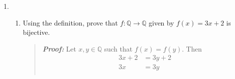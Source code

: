 \documentclass{article}
\newcommand{\Proof}{\textit{\textbf{Proof: }}}
\newcommand{\ZZ}{\mathbb{Z}}
\newcommand{\QQ}{\mathbb{Q}}
\begin{document}
\begin{enumerate}
\begin{enumerate}
\item Establish the following identity using induction.
\[
\sum_{i = 1}^{n}i^{3} = \left(\frac{n(n+1)}{2}\right)^{2}
\]
\begin{quote}
\Proof \\
\textit{\textbf{Base Case: }} $n = 1$
\begin{align*}
\sum_{i = 1}^{1}i^{3} &= \left(\frac{1(1+1)}{2}\right)^{2}\\
1 ^{3} &= \left(\frac{2}{2}\right)^{2}\\
1 &= 1
\end{align*}
\textit{\textbf{Assume: }} $$\sum_{i = 1}^{n}i^{3} = \left(\frac{n(n+1)}{2}\right)^{2}$$
\textit{\textbf{Prove: }}
\[
\sum_{i = 1}^{n + 1}i^{3} = \left(\frac{(n + 1)(n+2)}{2}\right)^{2}
\]
\begin{align*}
\therefore \sum_{i = 1}^{n}i^{3} + \sum_{i = n + 1}^{n + 1}i^{3} &= \left(\frac{n(n+1)}{2}\right)^{2} + (n + 1)^{3}\ \ \text{By the Induction Hypothesis}\\
&= \frac{n^{2}(n+1)^{2}}{4} + (n+1)^{3}\\
&= \frac{n^{2}(n+1)^{2}}{4} + \frac{4(n+1)^{3}}{4}\\
&= \frac{n^{2}(n+1)^{2} + 4(n+1)^{3}}{4}\\
&= \frac{(n+1)^{2}(n^{2} + 4n + 4)}{4}\\
&= \frac{(n+1)^{2}(n+2)^{2}}{2^{2}}\\
&= \left(\frac{(n+1)(n+2)}{2}\right)^{2}
\end{align*}
\end{quote}
$\triangle$
\item Prove that if $n^{3}$ is odd, then $n$ is odd.
\begin{quote}
\Proof Assume the contrapositive: if $n$ is even, then $n^{3}$ is even.
Then $n = 2k$ for $k\in \ZZ$, which mean that $n^{3} = (2k)^{3}$.
$(2k)^{3} = 2(2^{2}k^{3})$ where $(2^{2}k^{3}) \in \ZZ$. Therefore $n^{3}$ is even.
\end{quote}
$\triangle$
\end{enumerate}
\newpage
\item
\begin{enumerate}
\item Using the definition, prove that $f: \QQ \to \QQ$ given by $f(x) = 3x+2$ is bijective.
\begin{quote}
\Proof Let $x,y \in \QQ$ such that $f(x) = f(y)$. Then
\begin{align*}
3x + 2 &= 3y + 2\\
3x &= 3y\\

\end{align*}
\end{quote}
\end{enumerate}
\end{enumerate}
\end{document}
